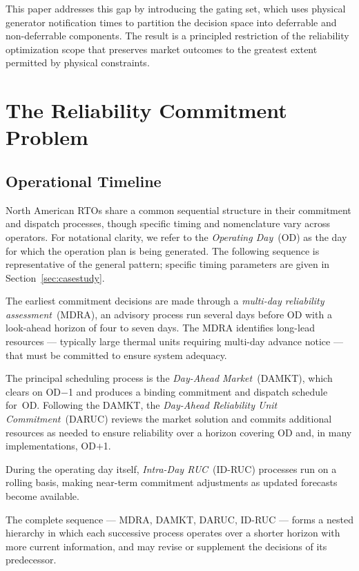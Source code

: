 \documentclass[journal]{IEEEtran}
\begin{document}
This paper addresses this gap by introducing the gating set, which
uses physical generator notification times to partition the
decision space into deferrable and non-deferrable components.
The result is a principled restriction of the reliability
optimization scope that preserves market outcomes to the greatest
extent permitted by physical constraints.


\section{The Reliability Commitment Problem}

\subsection{Operational Timeline}

North American RTOs share a common sequential structure in their
commitment and dispatch processes, though specific timing and
nomenclature vary across operators.
For notational clarity, we refer to the \emph{Operating Day}~(OD)
as the day for which the operation plan is being generated.
The following sequence is representative of the general pattern;
specific timing parameters are given in
Section~\ref{sec:casestudy}.

The earliest commitment decisions are made through a
\emph{multi-day reliability assessment}~(MDRA), an advisory process
run several days before OD with a look-ahead horizon of four to
seven days.
The MDRA identifies long-lead resources --- typically large thermal
units requiring multi-day advance notice --- that must be committed
to ensure system adequacy.

The principal scheduling process is the \emph{Day-Ahead
Market}~(DAMKT), which clears on OD$-$1 and produces a binding
commitment and dispatch schedule for~OD.
Following the DAMKT, the \emph{Day-Ahead Reliability Unit
Commitment}~(DARUC) reviews the market solution and commits
additional resources as needed to ensure reliability over a horizon
covering OD and, in many implementations, OD$+$1.

During the operating day itself, \emph{Intra-Day RUC}~(ID-RUC)
processes run on a rolling basis, making near-term commitment
adjustments as updated forecasts become available.

The complete sequence --- MDRA, DAMKT, DARUC, ID-RUC --- forms a
nested hierarchy in which each successive process operates over a
shorter horizon with more current information, and may revise or
supplement the decisions of its predecessor.
\end{document}
